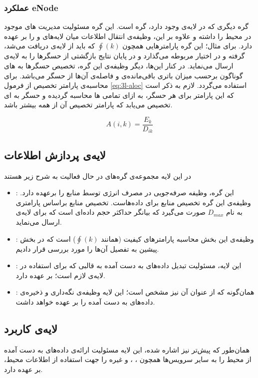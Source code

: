 \subsubsection{عملکرد eNode}
گره دیگری که در لایه‌ی  وجود دارد، گره  است. این گره مسئولیت مدیریت های موجود در محیط را داشته و علاوه بر این، وظیفه‌ی انتقال اطلاعات میان لایه‌های  و  را بر عهده دارد. برای مثال؛ این گره پارامترهایی همچون $\oint(k)$ که باید از لایه‌ی  دریافت می‌شد، گرفته و در اختیار  مربوطه می‌گذارد و در پایان نتایج بازگشتی از حسگرها را به لایه‌ی  ارسال می‌نماید. در کنار این‌ها، دیگر وظیفه‌ی این گره، تخصیص حسگرها به های گوناگون برحسب میزان باتری باقی‌مانده‌ی  و فاصله‌ی آن‌ها از حسگر می‌باشد. برای محاسبه‌ی پارامتر تخصیص از فرمول \ref{eq:3l-aloc} استفاده می‌گردد. لازم به ذکر است که این پارامتر برای هر حسگر، به ازای تمامی ها محاسبه گردیده و حسگر به ای تخصیص می‌یابد که پارامتر تخصیص آن از همه بیشتر باشد.

\begin{equation}
A(i, k) = \frac{E_k}{D_{ik}}
\label{eq:3l-aloc}
\end{equation}

\subsection{لایه‌ی پردازش اطلاعات }
در این لایه مجموعه‌ی گره‌های در حال فعالیت به شرح زیر هستند

\begin{itemize}
\item{
:
این گره، وظیفه صرفه‌جویی در مصرف انرژی توسط منابع  را برعهده دارد. وظیفه‌ی این گره تخصیص منابع برای داده‌هاست. تخصیص منابع براساس پارامتری به نام $D_{max}$ صورت می‌گیرد که بیانگر حداکثر حجم داده‌ای است که  برای لایه‌ی  ارسال می‌نماید.
}
\item{
:
وظیفه‌ی این بخش محاسبه پارامترهای کیفیت (همانند $\oint(k)$) است که در بخش پیشین به تفصیل آن‌ها را مورد بررسی قرار دادیم.
}
\item{
:
این لایه‌، مسئولیت تبدیل داده‌های به دست آمده به قالبی که برای استفاده در لایه‌ی  لازم است؛ بر عهده دارد.
}
\item{
:
همان‌گونه که از عنوان آن نیز مشخص است؛ این لایه وظیفه‌ی نگه‌داری و ذخیره‌ی داده‌های به دست آمده را بر عهده خواهد داشت.
}
\end{itemize}

\subsection{لایه‌ی کاربرد }
همان‌طور که پیش‌تر نیز اشاره شده، این لایه مسئولیت ارائه‌ی داده‌های به دست آمده از محیط را به سایر سرویس‌ها همچون
،
،
و غیره را جهت استفاده از اطلاعات محیط، بر عهده دارد.























